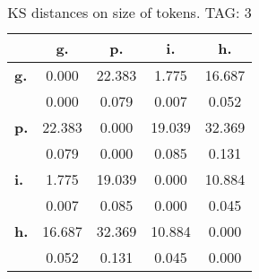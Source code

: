 \begin{table}[h!]
\begin{center}
\begin{tabular}{| l || c | c | c | c |}\hline
 & {\bf g.} & {\bf p.} & {\bf i.} & {\bf h.} \\\hline\hline
{\bf g.} & 0.000 & 22.383 & 1.775 & 16.687 \\
{\bf } & 0.000 & 0.079 & 0.007 & 0.052 \\\hline
{\bf p.} & 22.383 & 0.000 & 19.039 & 32.369 \\
{\bf } & 0.079 & 0.000 & 0.085 & 0.131 \\\hline
{\bf i.} & 1.775 & 19.039 & 0.000 & 10.884 \\
{\bf } & 0.007 & 0.085 & 0.000 & 0.045 \\\hline
{\bf h.} & 16.687 & 32.369 & 10.884 & 0.000 \\
{\bf } & 0.052 & 0.131 & 0.045 & 0.000 \\\hline
\end{tabular}
\caption{KS distances on size of tokens. TAG: 3}
\end{center}
\end{table}